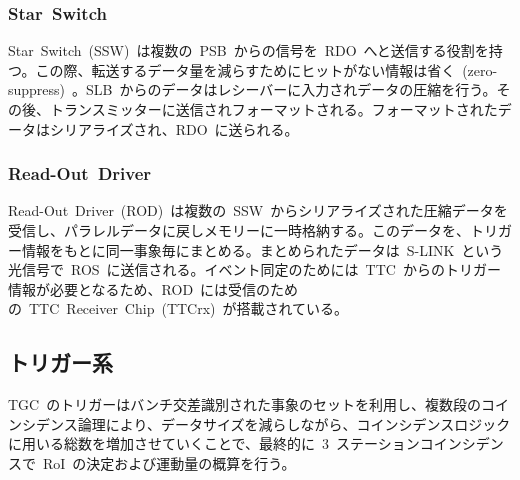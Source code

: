 \subsubsection{Star~Switch}
Star~Switch~(SSW)~は複数の~PSB~からの信号を~RDO~へと送信する役割を持つ。この際、転送するデータ量を減らすためにヒットがない情報は省く~(zero-suppress)~。SLB~からのデータはレシーバーに入力されデータの圧縮を行う。その後、トランスミッターに送信されフォーマットされる。フォーマットされたデータはシリアライズされ、RDO~に送られる。

\subsubsection{Read-Out~Driver}
Read-Out~Driver~(ROD)~は複数の~SSW~からシリアライズされた圧縮データを受信し、パラレルデータに戻しメモリーに一時格納する。このデータを、トリガー情報をもとに同一事象毎にまとめる。まとめられたデータは~S-LINK~という光信号で~ROS~に送信される。イベント同定のためには~TTC~からのトリガー情報が必要となるため、ROD~には受信のための~TTC~Receiver~Chip~(TTCrx)~が搭載されている。

\subsection{トリガー系}
TGC~のトリガーはバンチ交差識別された事象のセットを利用し、複数段のコインシデンス論理により、データサイズを減らしながら、コインシデンスロジックに用いる総数を増加させていくことで、最終的に~3~ステーションコインシデンスで~RoI~の決定および運動量の概算を行う。
